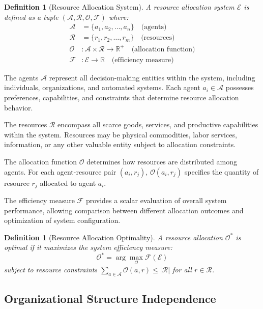 \documentclass[12pt,a4paper]{article}
\newtheorem{definition}[theorem]{Definition}
\begin{document}
\begin{definition}[Resource Allocation System]
A resource allocation system $\mathcal{E}$ is defined as a tuple $(\mathcal{A}, \mathcal{R}, \mathcal{O}, \mathcal{F})$ where:
\begin{align}
\mathcal{A} &= \{a_1, a_2, \ldots, a_n\} \quad \text{(agents)} \\
\mathcal{R} &= \{r_1, r_2, \ldots, r_m\} \quad \text{(resources)} \\
\mathcal{O} &: \mathcal{A} \times \mathcal{R} \to \mathbb{R}^+ \quad \text{(allocation function)} \\
\mathcal{F} &: \mathcal{E} \to \mathbb{R} \quad \text{(efficiency measure)}
\end{align}
\end{definition}

The agents $\mathcal{A}$ represent all decision-making entities within the system, including individuals, organizations, and automated systems. Each agent $a_i \in \mathcal{A}$ possesses preferences, capabilities, and constraints that determine resource allocation behavior.

The resources $\mathcal{R}$ encompass all scarce goods, services, and productive capabilities within the system. Resources may be physical commodities, labor services, information, or any other valuable entity subject to allocation constraints.

The allocation function $\mathcal{O}$ determines how resources are distributed among agents. For each agent-resource pair $(a_i, r_j)$, $\mathcal{O}(a_i, r_j)$ specifies the quantity of resource $r_j$ allocated to agent $a_i$.

The efficiency measure $\mathcal{F}$ provides a scalar evaluation of overall system performance, allowing comparison between different allocation outcomes and optimization of system configuration.

\begin{definition}[Resource Allocation Optimality]
A resource allocation $\mathcal{O}^*$ is optimal if it maximizes the system efficiency measure:
\begin{equation}
\mathcal{O}^* = \arg\max_{\mathcal{O}} \mathcal{F}(\mathcal{E})
\end{equation}
subject to resource constraints $\sum_{a \in \mathcal{A}} \mathcal{O}(a,r) \leq |\mathcal{R}|$ for all $r \in \mathcal{R}$.
\end{definition}

\subsection{Organizational Structure Independence}
\end{document}
